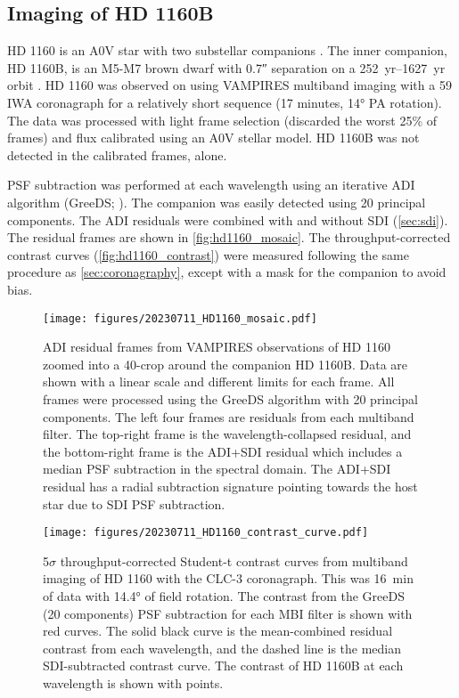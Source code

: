 
\subsection{Imaging of HD 1160B\label{sec:hd1160}}

HD 1160 is an A0V star with two substellar companions \citep{nielsen_gemini_2012,maire_first_2016,garcia_scexao_2017,mesa_characterizing_2020}. The inner companion, HD 1160B, is an M5-M7 brown dwarf with \ang{;;0.7} separation on a \SIrange{252}{1627}{yr} orbit \citep{blunt_orbits_2017}. HD 1160 was observed on  using VAMPIRES multiband imaging with a \SI{59}{\mas} IWA coronagraph for a relatively short sequence (17 minutes, \ang{14} PA rotation). The data was processed with light frame selection (discarded the worst 25\% of frames) and flux calibrated using an A0V stellar model. HD 1160B was not detected in the calibrated frames, alone.

PSF subtraction was performed at each wavelength using an iterative ADI algorithm (GreeDS; \citealt{pairet_reference-less_2019,pairet_mayonnaise_2020,stapper_iterative_2022}). The companion was easily detected using 20 principal components. The ADI residuals were combined with and without SDI (\autoref{sec:sdi}). The residual frames are shown in \autoref{fig:hd1160_mosaic}. The throughput-corrected contrast curves (\autoref{fig:hd1160_contrast}) were measured following the same procedure as \autoref{sec:coronagraphy}, except with a mask for the companion to avoid bias.

\begin{figure*}[t]
    \centering
    \texttt{[image: figures/20230711\_HD1160\_mosaic.pdf]}
    \caption{ADI residual frames from VAMPIRES observations of HD 1160 zoomed into a \SI{40}{\pixel}-crop around the companion HD 1160B. Data are shown with a linear scale and different limits for each frame. All frames were processed using the GreeDS algorithm with 20 principal components. The left four frames are residuals from each multiband filter. The top-right frame is the wavelength-collapsed residual, and the bottom-right frame is the ADI+SDI residual which includes a median PSF subtraction in the spectral domain. The ADI+SDI residual has a radial subtraction signature pointing towards the host star due to SDI PSF subtraction.\label{fig:hd1160_mosaic}}
\end{figure*}

\begin{figure}
    \centering
    \texttt{[image: figures/20230711\_HD1160\_contrast\_curve.pdf]}
    \caption{5$\sigma$ throughput-corrected Student-t contrast curves from multiband imaging of HD 1160 with the CLC-3 coronagraph. This was \SI{16}{\minute} of data with \ang{14.4} of field rotation. The contrast from the GreeDS (20 components) PSF subtraction for each MBI filter is shown with red curves. The solid black curve is the mean-combined residual contrast from each wavelength, and the dashed line is the median SDI-subtracted contrast curve. The contrast of HD 1160B at each wavelength is shown with points.\label{fig:hd1160_contrast}}
\end{figure}

